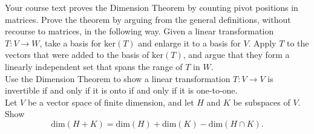 \documentclass[a4paper,11pt]{article}
\newcommand{\ddim}{\text{dim}}
\begin{document}
 Your course text proves the Dimension Theorem by
counting pivot positions in matrices. Prove the theorem by arguing from the
general definitions, without recourse to matrices, in the following way. Given a
linear transformation $T : V \rightarrow W$, take a basis for $\text{ker}(T)$
and enlarge it to a basis for $V$. Apply $T$ to the vectors that were added to
the basis of $\text{ker}(T)$, and argue that they form a linearly independent
set that spans the range of $T$ in $W$. \\

 Use the Dimension Theorem to show a linear
transformation $T: V \rightarrow V$ is invertible if and only if it is onto if
and only if it is one-to-one. \\

 Let $V$ be a vector space of finite dimension,
and let $H$ and $K$ be subspaces of $V$. Show
\[
  \ddim(H+K) = \ddim(H) + \ddim(K) - \ddim(H \cap K).
\]
\end{document}

